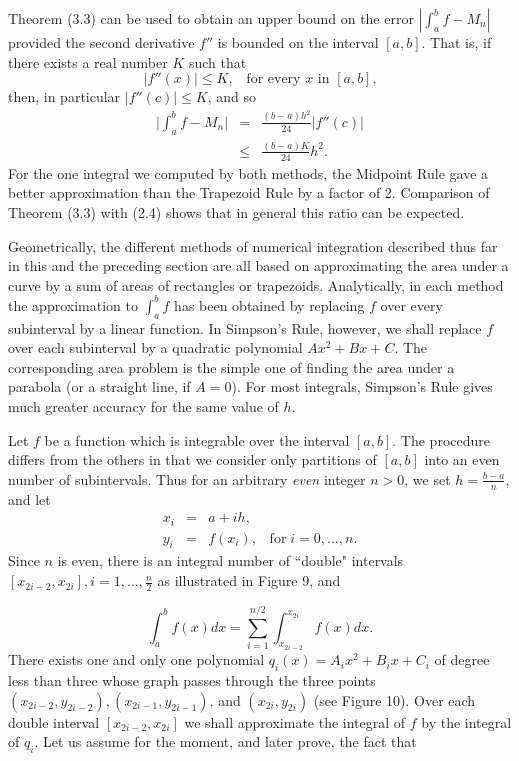 Theorem (3.3) can be used to obtain an upper bound on the error $|\int_a^b f - M_n|$ provided the second derivative $f''$ is bounded on the interval $[a, b]$. That is, if there exists a real number $K$ such that
$$
| f''(x) | \leq K, \;\;\; \mbox{for every $x$ in $[a, b]$,} 
$$
\noindent then, in particular $|f''(c)| \leq K$, and so
\begin{eqnarray*} 
\Big| \int_a^b  f - M_n \Big| &=& \frac{(b - a)h^2}{24} | f''(c) | \\ 
                                           &\leq& \frac{(b - a)K}{24} h^2 .
\end{eqnarray*}
For the one integral we computed by both methods, the Midpoint Rule gave a better approximation than the Trapezoid Rule by a factor of 2. Comparison of Theorem (3.3) with (2.4) shows that in general this ratio can be expected.

Geometrically, the different methods of numerical integration described thus far in this and the preceding section are all based on approximating the area under a curve by a sum of areas of rectangles or trapezoids. Analytically, in each method the approximation to $\int_a^b f$ has been obtained by replacing $f$ over every subinterval by a linear function. In Simpson's Rule, however, we shall replace $f$ over each subinterval by a quadratic polynomial $Ax^2 + Bx + C$. The corresponding area problem is the simple one of finding the area under a parabola (or a straight line, if $A = 0$). For most integrals, Simpson's Rule gives much greater accuracy for the same value of $h$.

Let $f$ be a function which is integrable over the interval $[a, b]$. The procedure differs from the others in that we consider only partitions of $[a, b]$ into an even number of subintervals. Thus for an arbitrary \textit{even} integer $n > 0$, we set $h = \frac{b - a}{n}$, and let
\begin{eqnarray*}
x_i &=& a + ih,\\
y_i &=& f (x_i), \;\;\; \mbox{for}\; i = 0, . . ., n.
\end{eqnarray*}
\noindent Since $n$ is even, there is an integral number of ``double" intervals $[x_{2i-2}, x_{2i}], i = 1, ... , \frac{n}{2}$ as illustrated in Figure 9, and

$$ 
\int_a^b f(x) dx= \sum_{i=1}^{n/2} \int_{x_{2i-2}}^{x_{2i}} f(x) dx. 
$$
\noindent There exists one and only one polynomial $q_i(x) = A_i x^2 + B_i x + C_i$ of degree less than three whose graph passes through the three points $(x_{2i-2}, y_{2i-2}), (x_{2i-1}, y_{2i-1})$, and $(x_{2i}, y_{2i})$ (see Figure 10). Over each double interval $[x_{2i-2}, x_{2i}]$ we shall approximate the integral of $f$ by the integral of $q_i$. Let us assume for the moment, and later prove, the fact that


